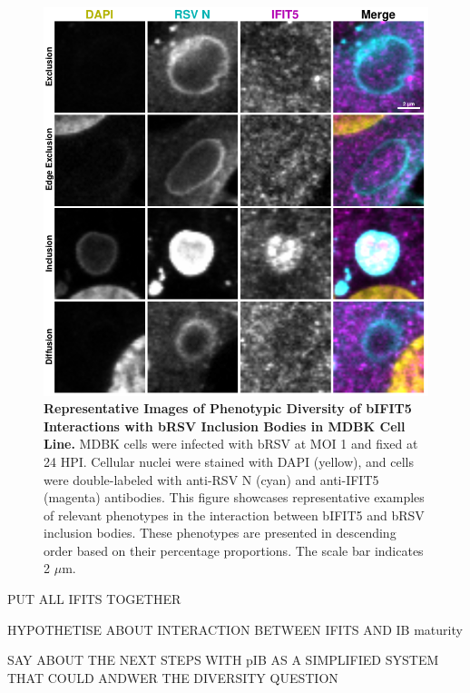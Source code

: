 \begin{figure}
    \centering
    \includegraphics[width=1\linewidth]{08. Chapter 3/Figs/02. Infection/04. IFIT5/09. mdbk i5.pdf}
    \caption[Representative Images of Phenotypic Diversity of bIFIT5 Interactions with bRSV Inclusion Bodies in MDBK Cell Line.]{\textbf{Representative Images of Phenotypic Diversity of bIFIT5 Interactions with bRSV Inclusion Bodies in MDBK Cell Line.} MDBK cells were infected with bRSV at MOI 1 and fixed at 24 HPI. Cellular nuclei were stained with DAPI (yellow), and cells were double-labeled with anti-RSV N (cyan) and anti-IFIT5 (magenta) antibodies. This figure showcases representative examples of relevant phenotypes in the interaction between bIFIT5 and bRSV inclusion bodies. These phenotypes are presented in descending order based on their percentage proportions. The scale bar indicates 2 \(\mu \mbox{m}\).}
    \label{fig:Representative Images of Phenotypic Diversity of bIFIT5 Interactions with bRSV Inclusion Bodies in MDBK Cell Line}
\end{figure}

PUT ALL IFITS TOGETHER

HYPOTHETISE ABOUT INTERACTION BETWEEN IFITS AND IB maturity

SAY ABOUT THE NEXT STEPS WITH pIB AS A SIMPLIFIED SYSTEM THAT COULD ANDWER THE DIVERSITY QUESTION

